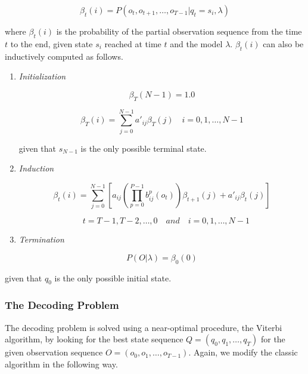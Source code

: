 \documentclass{article}[14pt, oneside, a4paper, times]
\begin{document}
\begin{equation}
    \beta_t(i) = P(o_t, o_{t+1}, \ldots, o_{T-1} | q_t = s_i, \lambda)
    \label{EQ:beta}
\end{equation}

\noindent where $\beta_t(i)$ is the probability of the partial observation
sequence from the time $t$ to the end, given state $s_i$ reached at time $t$
and the model $\lambda$. $\beta_t(i)$ can also be inductively computed as
follows.

\begin{enumerate}
\item \textit{Initialization}

\begin{equation}
    \beta_T(N-1) = 1.0
    \label{EQ:beta-initialization}
\end{equation}

$$\beta_T(i) = \sum_{j=0}^{N-1} a'_{ij} \beta_T(j) \quad i = 0, 1, \dots, N-1$$

\noindent given that $s_{N-1}$ is the only possible terminal state.


\item \textit{Induction}

\begin{equation}
    \beta_{t}(i) = \sum_{j=0}^{N-1} \left[ a_{ij} \left( \prod_{p=0}^{P-1}  b_{ij}^p(o_t) \right)
                        \beta_{t+1}(j) + a'_{ij} \beta_t(j) \right]
    \label{EQ:beta-induction}
\end{equation}

$$\quad t = T-1, T-2, \ldots, 0 \quad and \quad i = 0, 1, \ldots, N-1$$


\item \textit{Termination}

\begin{equation}
    P(O|\lambda) = \beta_0(0)
    \label{EQ:beta-termination}
\end{equation}
\end{enumerate}

\noindent given that $q_0$ is the only possible initial state.


\subsubsection{The Decoding Problem}
\label{AP:the-decoding-problem}


The decoding problem is solved using a near-optimal procedure, the Viterbi
algorithm, by looking for the best state sequence $Q = (q_0, q_1, \ldots, q_T)$
for the given observation sequence $O = (o_0, o_1, \ldots, o_{T-1})$. Again, we
modify the classic algorithm \cite{Rabiner89} in the following way.
\end{document}
